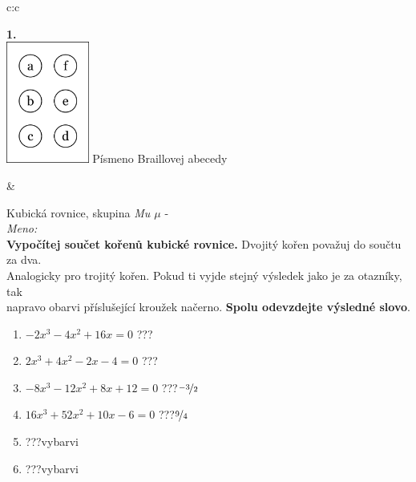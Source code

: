 \documentclass[10pt]{report}
\begin{document}
\begin{tabular}{c:c}
\begin{minipage}[c][99mm][t]{0.49\linewidth}
\begin{center}
\begin{minipage}{0.20\linewidth}
\begin{center}
{\Huge\bfseries 1.} \\[2mm]
\includegraphics[height=40mm]{../images/braille.png}
{\small Písmeno Braillovej abecedy}
\end{center}
\end{minipage}
\end{center}
\end{minipage}
&
\begin{minipage}[c][99mm][t]{0.49\linewidth}
\begin{center}
\vspace{7mm}
{\huge Kubická rovnice, skupina \textit{Mu $\mu$} -}\\[4.5mm]
\textit{Meno:}\phantom{xxxxxxxxxxxxxxxxxxxxxxxxxxxxxxxxxxxxxxxxxxxxxxxxxxxxxxxxxxxxxxxxx}\\[3.5mm]
\textbf{Vypočítej součet kořenů kubické rovnice.} Dvojitý kořen považuj do součtu za dva.\\Analogicky pro trojitý kořen. Pokud ti vyjde stejný výsledek jako je za otazníky, tak\\napravo obarvi příslušející kroužek načerno. \textbf{Spolu odevzdejte výsledné slovo}.\\[3mm]
\begin{minipage}{0.77\linewidth}
\begin{center}
\begin{varwidth}{\textwidth}
\begin{enumerate}
\large
\item $-2x^3-4x^2+16x=0$\quad \dotfill\; ???\;\dotfill {}
\item $2x^3+4x^2-2x-4=0$\quad \dotfill\; ???\;\dotfill {}
\item $-8x^3-12x^2+8x+12=0$\quad \dotfill\; ???\;\dotfill \quad $\nicefrac{-3}{2}$
\item $16x^3+52x^2+10x-6=0$\quad \dotfill\; ???\;\dotfill \quad $\nicefrac{9}{4}$
\item \quad \dotfill\; ???\;\dotfill \quad vybarvi
\item \quad \dotfill\; ???\;\dotfill \quad vybarvi
\end{enumerate}

\end{varwidth}
\end{center}
\end{minipage}
\end{center}
\end{minipage}
\end{tabular}
\end{document}
